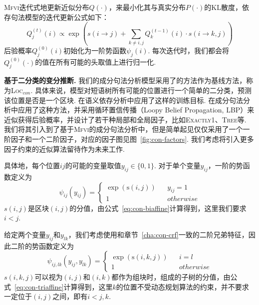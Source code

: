 \textsc{Mfvi}迭代式地更新近似分布$Q(\cdot)$，来最小化其与真实分布$P(\cdot)$的KL散度，依存句法模型的迭代更新公式如下\citep{wang-tu-2020-second}：
\begin{equation}
  \label{eq:mfvi-dep}
  Q_{j}^{(t)}(i)\propto \exp\left(s(i\rightarrow j) +\sum_{k\neq i,j} Q_{k}^{(t-1)}(i)\cdot s(i\rightarrow {k,j}) \right)
\end{equation}
后验概率$Q_j^{(0)}(i)$初始化为一阶势函数$\psi_j(i)$.
每次迭代时，我们都会将$Q_j^{(0)}(\cdot)$的值在所有可能的头取值上进行归一化.

\noindent\textbf{基于二分类的变分推断.}
我们的成分句法分析模型采用了\citep{gaddy-etal-2018-whats}的方法作为基线方法，称为\textsc{Loc}$_{con}$.
具体来说，模型对短语树所有可能的位置进行一个简单的二分类，预测该位置是否是一个区块.
\citep{dozat-manning-2018-simpler,wang-etal-2019-second}在语义依存分析中应用了这样的训练目标.
\citep{gormley-eisner-2015-structured,naradowsky-etal-2012-grammarless}在成分句法分析中应用了这种方法，并采用循环置信传播（Loopy Belief Propagation, LBP）来近似获得后验概率，并设计了若干种局部和全局因子，比如\textsc{Exactly1}、\textsc{Tree}等.
我们将其引入到了基于\textsc{Mfvi}的成分句法分析中，但是简单起见仅仅采用了一个一阶因子和一个二阶因子，对应的因子图见图~\ref{fig:con-factors}.
我们考虑将引入更多因子约束的近似算法留待作为未来工作.


具体地，每个位置$ij$的可能的变量取值$y_{ij}\in \{0,1\}$. 对于单个变量$y_{ij}$，一阶的势函数定义为
\begin{equation}
  \label{eq:con-1o-potential}
  \psi_{ij}(y_{ij})=\left\{
  \begin{array}{rcl}
    \exp\left(\mathrm{s}(i,j)\right) &  & {y_{ij}=1}  \\
    1                                &  & {otherwise}
  \end{array}
  \right.
\end{equation}
$s(i,j)$是区块$(i,j)$的分值，由公式~\ref{eq:con-biaffine}计算得到，这里我们要求$i<j$.

给定两个变量$y_{ij}$和$y_{lk}$，我们考虑使用和章节~\ref{cha:con-crf}一致的二阶兄弟特征，因此二阶的势函数定义为
\begin{equation}
  \label{eq:2o-con-potential}
  \psi_{ij,lk}(y_{ij},y_{lk})=\left\{
  \begin{array}{rcl}
    \exp\left(\mathrm{s}(i,k,j)\right) &  & {i=l}       \\
    1                                  &  & {otherwise}
  \end{array}
  \right.
\end{equation}
$s(i,k,j)$可以视为$(i,j)$和$(i,k)$都作为组块时，组成的子树的分值，由公式~\ref{eq:con-triaffine}计算得到，这里$k$的位置不受动态规划算法的约束，并不要求一定位于$(i,j)$之间，即有$i<j,k$.

